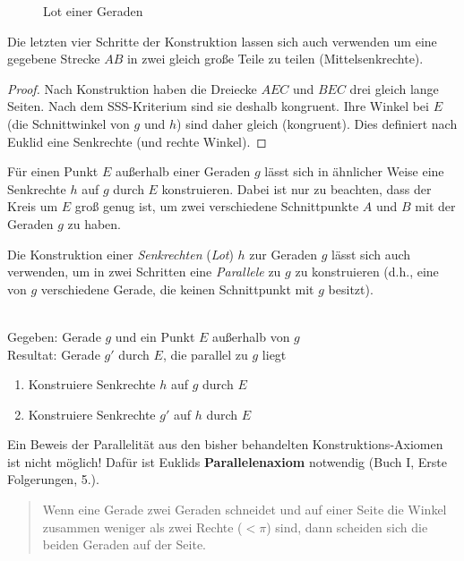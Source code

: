 
\begin{figure}[h]
    
    \caption{Lot einer Geraden}
\end{figure}

Die letzten vier Schritte der Konstruktion lassen sich auch verwenden um eine gegebene Strecke $AB$
in zwei gleich große Teile zu teilen (Mittelsenkrechte).


\begin{proof}
    Nach Konstruktion haben die Dreiecke $AEC$ und $BEC$ drei gleich lange Seiten. Nach dem
    SSS-Kriterium sind sie deshalb kongruent. Ihre Winkel bei $E$ (die Schnittwinkel von $g$ und
    $h$) sind daher gleich (kongruent). Dies definiert nach Euklid eine Senkrechte (und rechte
    Winkel).
\end{proof}

Für einen Punkt $E$ außerhalb einer Geraden $g$ lässt sich in ähnlicher Weise eine Senkrechte $h$
auf $g$ durch $E$ konstruieren. Dabei ist nur zu beachten, dass der Kreis um $E$ groß genug ist, um
zwei verschiedene Schnittpunkte $A$ und $B$ mit der Geraden $g$ zu haben.

Die Konstruktion einer {\em Senkrechten} ({\em Lot}) $h$ zur Geraden $g$ lässt sich auch verwenden,
um in zwei Schritten eine {\em Parallele} zu $g$ zu konstruieren (d.h., eine von $g$ verschiedene
Gerade, die keinen Schnittpunkt mit $g$ besitzt).

\begin{konst}\ \\
    Gegeben: Gerade $g$ und ein Punkt $E$ außerhalb von $g$\\
    Resultat: Gerade $g'$ durch $E$, die parallel zu $g$ liegt
    \renewcommand{\labelenumi}{\arabic{enumi}.} %
    \begin{enumerate}
        \item Konstruiere Senkrechte $h$ auf $g$ durch $E$
        \item Konstruiere Senkrechte $g'$ auf $h$ durch $E$
    \end{enumerate}
\end{konst}

Ein Beweis der Parallelität aus den bisher behandelten Konstruktions-Axiomen ist nicht möglich!
Dafür ist Euklids {\bf Parallelenaxiom} notwendig (Buch I, Erste Folgerungen, 5.).
\begin{quote}
Wenn eine Gerade %
zwei Geraden %
schneidet und auf einer Seite die Winkel
zusammen weniger als zwei Rechte ($<\pi$) sind, dann scheiden sich die beiden Geraden auf der Seite.
\end{quote}

